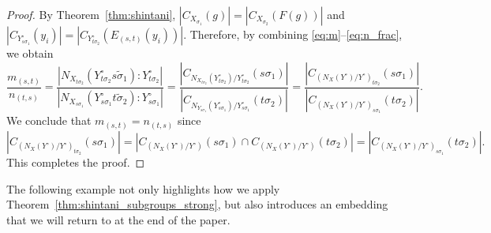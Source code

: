 \documentclass[11pt]{article}
\numberwithin{equation}{section}
\theoremstyle{shdefinition}
\theoremstyle{shplain}
\newcommand{\s}{\sigma}
\newcommand{\ws}{\widetilde{\sigma}}
\newcommand{\<}{\langle}
\renewcommand{\>}{\rangle}
\renewcommand{\:}{\colon}
\begin{document}
\begin{proof}
By Theorem~\ref{thm:shintani}, $|C_{X_{\s_1}}(g)| = |C_{X_{\s_2}}(F(g))|$ and $|C_{Y^\circ_{s\s_1}}(y_i)| = |C_{Y^\circ_{t\s_2}}(E_{(s,t)}(y_i))|$. Therefore, by combining \eqref{eq:m}--\eqref{eq:n_frac}, we obtain
\[
\frac{m_{(s,t)}}{n_{(t,s)}} 
= \frac{|N_{X_{t\s_2}}(Y^\circ_{t\s_2}s\ws_1):Y^\circ_{t\s_2}|}{|N_{X_{s\s_1}}(Y^\circ_{s\s_1}t\ws_2):Y^\circ_{s\s_1}|} 
= \frac{|C_{N_{X_{t\s_2}}(Y^\circ_{t\s_2})/Y^\circ_{t\s_2}}(s\s_1)|}{|C_{N_{Y_{s\s_1}}(Y^\circ_{s\s_1})/Y^\circ_{s\s_1}}(t\s_2)|} 
= \frac{|C_{(N_X(Y^\circ)/Y^\circ)_{t\s_2}}(s\s_1)|}{|C_{(N_X(Y^\circ)/Y^\circ)_{s\s_1}}(t\s_2)|}.
\]
We conclude that $m_{(s,t)}=n_{(t,s)}$ since
\[
|C_{(N_X(Y^\circ)/Y^\circ)_{t\s_2}}(s\s_1)| = |C_{(N_X(Y^\circ)/Y^\circ)}(s\s_1) \cap C_{(N_X(Y^\circ)/Y^\circ)}(t\s_2)| = |C_{(N_X(Y^\circ)/Y^\circ)_{s\s_1}}(t\s_2)|.
\]
This completes the proof.
\end{proof}

The following example not only highlights how we apply Theorem~\ref{thm:shintani_subgroups_strong}, but also introduces an embedding that we will return to at the end of the paper.
\end{document}
